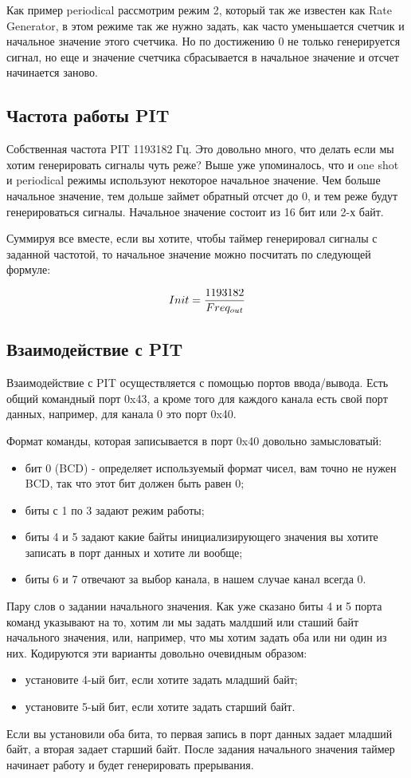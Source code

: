 Как пример periodical рассмотрим режим 2, который так же известен как Rate
Generator, в этом режиме так же нужно задать, как часто уменьшается счетчик и
начальное значение этого счетчика. Но по достижению 0 не только генерируется
сигнал, но еще и значение счетчика сбрасывается в начальное значение и отсчет
начинается заново.

\subsection{Частота работы PIT}

Собственная частота PIT 1193182 Гц. Это довольно много, что делать если мы хотим
генерировать сигналы чуть реже? Выше уже упоминалось, что и one shot и
periodical режимы используют некоторое начальное значение. Чем больше начальное
значение, тем дольше займет обратный отсчет до 0, и тем реже будут
генерироваться сигналы. Начальное значение состоит из 16 бит или 2-х байт.

Суммируя все вместе, если вы хотите, чтобы таймер генерировал сигналы с заданной
частотой, то начальное значение можно посчитать по следующей формуле:

\[
  Init = {1193182\over Freq_{out}}
\]

\subsection{Взаимодействие с PIT}

Взаимодействие с PIT осуществляется с помощью портов ввода/вывода. Есть общий
командный порт 0x43, а кроме того для каждого канала есть свой порт данных,
например, для канала 0 это порт 0x40.

Формат команды, которая записывается в порт 0x40 довольно замысловатый:
\begin{itemize}
  \item бит 0 (BCD) - определяет используемый формат чисел, вам точно не нужен
  BCD, так что этот бит должен быть равен 0;
  \item биты с 1 по 3 задают режим работы;
  \item биты 4 и 5 задают какие байты инициализирующего значения вы хотите
  записать в порт данных и хотите ли вообще;
  \item биты 6 и 7 отвечают за выбор канала, в нашем случае канал всегда 0.
\end{itemize}

Пару слов о задании начального значения. Как уже сказано биты 4 и 5 порта команд
указывают на то, хотим ли мы задать малдший или сташий байт начального значения,
или, например, что мы хотим задать оба или ни один из них. Кодируются эти
варианты довольно очевидным образом:
\begin{itemize}
  \item установите 4-ый бит, если хотите задать младший байт;
  \item установите 5-ый бит, если хотите задать старший байт.
\end{itemize}

Если вы установили оба бита, то первая запись в порт данных задает младший байт,
а вторая задает старший байт. После задания начального значения таймер начинает
работу и будет генерировать прерывания.

